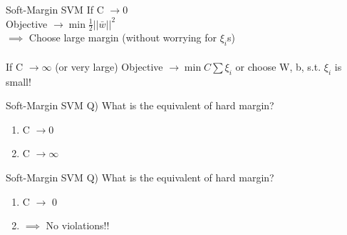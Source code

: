 \documentclass{beamer}
\begin{document}
	\begin{frame}{Soft-Margin SVM}
		If C $\rightarrow 0$ \\
		\hspace{0.3cm} Objective $\rightarrow \min \frac{1}{2}\lvert\lvert\bar{w}\rvert\rvert^{2}$ \\
		\hspace{0.3cm} $\implies$ Choose large margin (without worrying for $\xi_{i}$s) \\
		\vspace{0.4cm}
		\hspace{2cm} \\
		
		If C $\rightarrow \infty$ (or very large) 
		\hspace{0.3cm} Objective $\rightarrow \min C\sum\xi_{i}$ or choose W, b, s.t. $\xi_{i}$ is small!
	\end{frame}
	\begin{frame}{Soft-Margin SVM}
		Q) What is the equivalent of hard margin?
		\hspace{0.5cm}\begin{enumerate}[a]
			\item C $\rightarrow 0$
			\item C $\rightarrow \infty$
		\end{enumerate}
	\end{frame}
	\begin{frame}{Soft-Margin SVM}
		Q) What is the equivalent of hard margin?
		\hspace{0.5cm}\begin{enumerate}[a]
			\item C $\rightarrow$ 0
			\item {} $\implies$ No violations!!
		\end{enumerate}
	\end{frame}
	
\end{document}
